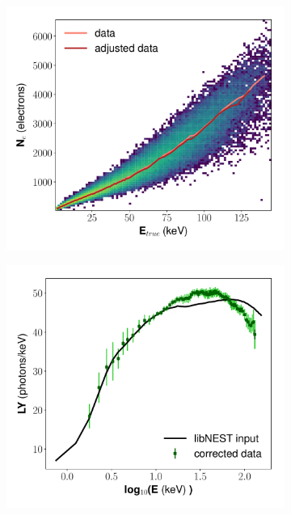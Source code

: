 \begin{figure}[h!]
\begin{subfigure}{0.5\textwidth}
  \includegraphics[width=\textwidth]{Figures/yields_corrections/C14_QN_heatmap_dat_gfdcm_180Vcm_prelim.pdf}
  \caption{}
\end{subfigure}
\begin{subfigure}{0.5\textwidth}
  \centering
  \includegraphics[width=\textwidth]{Figures/yields_corrections/C14_LY_final_gfdcm_180Vcm_prelim.pdf}
  \caption{}
\end{subfigure}%
\begin{subfigure}{0.5\textwidth}

\end{subfigure}
\end{figure}
